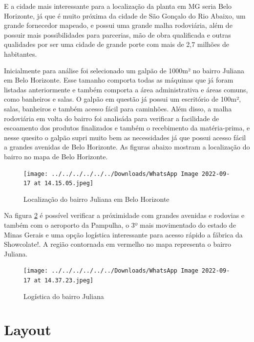\documentclass[
	12pt,				%
	openright,			%
	oneside,			%
	a4paper,			%
	english,			%
	french,				%
	spanish,			%
	brazil				%
	]{abntex2}
\begin{document}
E a cidade mais interessante para a localização da planta em MG seria Belo Horizonte, já que é muito próxima da cidade de São Gonçalo do Rio Abaixo, um grande fornecedor mapeado, e possui uma grande malha rodoviária, além de possuir mais possibilidades para parcerias, mão de obra qualificada e outras qualidades por ser uma cidade  de grande porte com mais de 2,7 milhões de habitantes. 

Inicialmente para análise foi selecionado um galpão de 1000m² no bairro Juliana em Belo Horizonte. Esse tamanho comporta todas as máquinas que já foram listadas anteriormente e também comporta a área administrativa e áreas comuns, como banheiros e salas. O galpão em questão já possui um escritório de 100m², salas, banheiros e também acesso fácil para caminhões. Além disso, a malha rodoviária em volta do bairro foi analisáda para verificar a facilidade de escoamento dos produtos finalizados e também o recebimento da matéria-prima, e nesse quesito o galpão supri muito bem as necessidades já que possui acesso fácil a grandes avenidas de Belo Horizonte. As figuras abaixo mostram a localização do bairro no mapa de Belo Horizonte.


\begin{figure}[H]
\begin{center}
\caption{Localização do bairro Juliana em Belo Horizonte}
\texttt{[image: ../../../../../../Downloads/WhatsApp Image 2022-09-17 at 14.15.05.jpeg]} 
\label{loca1}
\end{center}
\end{figure}

Na figura \ref{loca2} é possível verificar a próximidade com grandes avenidas e rodovias e também com o aeroporto da Pampulha, o 3º mais movimentado do estado de Minas Gerais e uma opção logística interessante para acesso rápido a fábrica da Showcolate!. A região contornada em vermelho no mapa representa o bairro Juliana.


\begin{figure}[H]
\begin{center}
\caption{Logística do bairro Juliana}
\texttt{[image: ../../../../../../Downloads/WhatsApp Image 2022-09-17 at 14.37.23.jpeg]} 
\label{loca2}
\end{center}
\end{figure}

\chapter{Layout}
\end{document}
